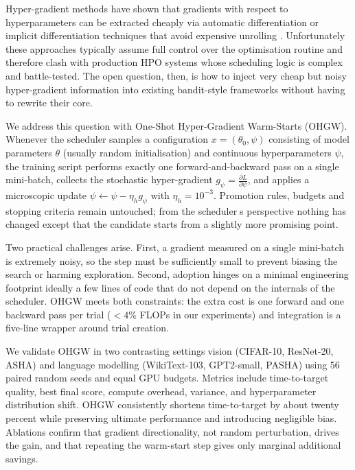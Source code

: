 \documentclass{article}
\begin{document}
Hyper-gradient methods have shown that gradients with respect to hyperparameters can be extracted cheaply via automatic differentiation \cite{chandra-2019-gradient} or implicit differentiation techniques that avoid expensive unrolling \cite{bertrand-2020-implicit}. Unfortunately these approaches typically assume full control over the optimisation routine and therefore clash with production HPO systems whose scheduling logic is complex and battle-tested. The open question, then, is how to inject very cheap but noisy hyper-gradient information into existing bandit-style frameworks without having to rewrite their core.

We address this question with One-Shot Hyper-Gradient Warm-Starts (OHGW). Whenever the scheduler samples a configuration \(x=(\theta_0,\psi)\) consisting of model parameters \(\theta\) (usually random initialisation) and continuous hyperparameters \(\psi\), the training script performs exactly one forward-and-backward pass on a single mini-batch, collects the stochastic hyper-gradient \(g_{\psi}=\tfrac{\partial L}{\partial \psi}\), and applies a microscopic update \(\psi \leftarrow \psi - \eta_h g_{\psi}\) with \(\eta_h = 10^{-3}\). Promotion rules, budgets and stopping criteria remain untouched; from the schedulers perspective nothing has changed except that the candidate starts from a slightly more promising point.

Two practical challenges arise. First, a gradient measured on a single mini-batch is extremely noisy, so the step must be sufficiently small to prevent biasing the search or harming exploration. Second, adoption hinges on a minimal engineering footprintideally a few lines of code that do not depend on the internals of the scheduler. OHGW meets both constraints: the extra cost is one forward and one backward pass per trial (\(<4 \%\) FLOPs in our experiments) and integration is a five-line wrapper around trial creation.

We validate OHGW in two contrasting settingsvision (CIFAR-10, ResNet-20, ASHA) and language modelling (WikiText-103, GPT2-small, PASHA)using 56 paired random seeds and equal GPU budgets. Metrics include time-to-target quality, best final score, compute overhead, variance, and hyperparameter distribution shift. OHGW consistently shortens time-to-target by about twenty percent while preserving ultimate performance and introducing negligible bias. Ablations confirm that gradient directionality, not random perturbation, drives the gain, and that repeating the warm-start step gives only marginal additional savings.
\end{document}
